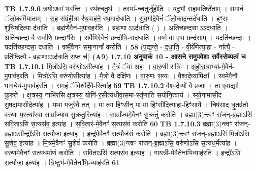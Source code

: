 \documentclass[17pt]{extarticle}
\begin{document}
                  \newline
                                \textbf{ TB 1.7.9.6} \newline
                  त्रयोऽश्वा॑ भवन्ति । रथ॑श्चतु॒र्थः । तस्मा᳚-च्च॒तुर्जु॑होति । यदु॒भौ स॒हाव॒तिष्ठे॑ताम् । स॒मा॒नं ॅलो॒कमि॑याताम् । स॒ह स॑ग्रंही॒त्रा र॑थ॒वाह॑ने॒ रथ॒माद॑धाति । सु॒व॒र्गादे॒वैनं॑ ॅलो॒काद॒न्तर्द॑धाति । हꣳ॒॒सः शु॑चि॒षदित्या द॑धाति । ब्रह्म॑णै॒वैन॑-मुपाव॒हर॑ति । ब्रह्म॒णा ऽऽद॑धाति ( ) । अति॑च्छन्द॒सा ऽऽद॑धाति । अति॑च्छन्दा॒ वै सर्वा॑णि॒ छन्दाꣳ॑सि । सर्वे॑भिरे॒वैनं॒ छन्दो॑भि॒-राद॑धाति । वर्ष्म॒ वा ए॒षा छन्द॑साम् । यदति॑च्छन्दाः । यदति॑च्छन्दसा॒ दधा॑ति । वर्ष्मै॒वैनꣳ॑ समा॒नानां᳚ करोति । \textbf{ 58} \newline
                  \newline
                                    (प॒द्य॒न्ते॒ - द॒धा॒ति॒ - वी॒र्ये॑णेत्या॒हा - ना᳚त्यै॒ - प्रति॑ष्ठित्यै॒ - ब्रह्म॒णाऽऽद॑धाति स॒प्त च॑) \textbf{(A9)} \newline \newline
                \textbf{ 1.7.10    अनुवाकं   10 - आसने समुपवेशः सर्वैस्सेव्यत्वं च} \newline
                                \textbf{ TB 1.7.10.1} \newline
                  मि॒त्रो॑ऽसि॒ वरु॑णो॒ऽसीत्या॑ह । मै॒त्रं ॅवा अहः॑ । वा॒रु॒णी रात्रिः॑ । अ॒हो॒रा॒त्राभ्या॑-मे॒वैन॑-मु॒पाव॑हरति । मि॒त्रो॑ऽसि॒ वरु॑णो॒सीत्या॑ह । मै॒त्रो वै दक्षि॑णः । वा॒रु॒णः स॒व्यः । वै॒श्व॒दे॒व्या॑मिक्षा᳚ । स्वमे॒वैनौ॑ भाग॒धेय॑-मु॒पाव॑हरति । सम॒हं ॅविश्वै᳚र्दे॒वै-रित्या॑ह \textbf{ 59} \newline
                  \newline
                                \textbf{ TB 1.7.10.2} \newline
                  वै॒श्व॒दे॒व्यो॑ वै प्र॒जाः । ता ए॒वाद्याः᳚ कुरुते । क्ष॒त्रस्य॒ नाभि॑रसि क्ष॒त्रस्य॒ योनि॑-र॒सीत्य॑धीवा॒समा-स्तृ॑णाति सयोनि॒त्वाय॑ । स्यो॒नामासी॑द सु॒षदा॒मासी॒देत्या॑ह । य॒था॒ य॒जुरे॒वै तत् । मा त्वा॑ हिꣳसी॒न् मा मा॑ हिꣳसी॒दित्या॒हा-हिꣳ॑सायै । निष॑साद धृ॒तव्र॑तो॒ वरु॑णः प॒स्त्या᳚स्वा साम्रा᳚ज्याय सु॒क्रतु॒रित्या॑ह । साम्रा᳚ज्यमे॒वैनꣳ॑ सु॒क्रतुं॑ करोति । ब्रह्मा(3)न्त्वꣳ रा॑जन्-ब्र॒ह्माऽसि॑ सवि॒ताऽसि॑ स॒त्यस॑व॒ इत्या॑ह । स॒वि॒तार॑-मे॒वैनꣳ॑ स॒त्यस॑वं करोति \textbf{ 60} \newline
                  \newline
                                \textbf{ TB 1.7.10.3} \newline
                  ब्रह्मा(3)न्त्वꣳ रा॑जन्-ब्र॒ह्माऽसीन्द्रो॑ऽसि स॒त्यौजा॒ इत्या॑ह । इन्द्र॑मे॒वैनꣳ॑ स॒त्यौज॑सं करोति । ब्रह्मा(3)न्त्वꣳ रा॑जन्-ब्र॒ह्माऽसि॑ मि॒त्रो॑ऽसि सु॒शेव॒ इत्या॑ह । मि॒त्रमे॒वैनꣳ॑ सु॒शेवं॑ करोति । ब्रह्मा(3)न्त्वꣳ रा॑जन्-ब्र॒ह्माऽसि॒ वरु॑णोऽसि स॒त्यध॒र्मेत्या॑ह । वरु॑णमे॒वैनꣳ॑ स॒त्यध॑र्माणं करोति । स॒वि॒ताऽसि॑ स॒त्यस॑व॒ इत्या॑ह । गा॒य॒त्री-मे॒वैतेना॑भि॒व्याह॑रति । इन्द्रो॑ऽसि स॒त्यौजा॒ इत्या॑ह । त्रि॒ष्टुभ॑-मे॒वैतेना॑भि॒-व्याह॑रति \textbf{ 61} \newline
\end{document}
